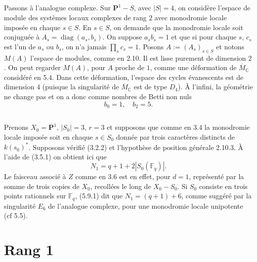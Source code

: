 \documentclass[11pt,a4paper]{article}
\theoremstyle{plain}
\theoremstyle{definition}
\DeclareMathOperator{\diag}{diag}
\newcommand{\F}{\mathbb{F}}
\newcommand{\C}{\mathbb{C}}
\begin{document}
\subsection{}
Passons \`a l'analogue complexe. Sur $\mathbf{P}^1 - S$, avec $|S| = 4$, on consid\`ere l'espace de module des syst\`emes locaux complexes de rang $2$ avec monodromie locale impos\'ee en chaque $s \in S$. En $s \in S$, on demande que la monodromie locale soit conjugu\'ee \`a $A_s = \diag(a_s, b_s)$. On suppose $a_s b_s = 1$ et que si pour chaque $s$, $c_s$ est l'un de $a_s$ ou $b_s$, on n'a jamais $\prod_s c_s = 1$. Posons $A := (A_s)_{s \in S}$ et notons $M(A)$ l'espace de modules, comme en 2.10. Il est lisse purement de dimension $2$. On peut regarder $M(A)$, pour $A$ proche de $1$, comme une d\'eformation de $\overline{M}_\C$ consid\'er\'e en 5.4. Dans cette d\'eformation, l'espace des cycles \'evanescents est de dimension $4$ (puisque la singularit\'e de $\overline{M}_\C$ est de type $D_4$). \`A l'infini, la g\'eom\'etrie ne change pas et on a donc comme nombres de Betti non nuls
\begin{equation}
b_0 = 1, \quad b_2 = 5.
\tag{5.8.1}
\end{equation}

\subsection{}
Prenons $X_0 = \mathbf{P}^1$, $|S_0| = 3$, $r = 3$ et supposons que comme en 3.4 la monodromie locale impos\'ee soit en chaque $s \in S_0$ donn\'ee par trois caract\`eres distincts de $k(s_0)^*$. Supposons v\'erifi\'e (3.2.2) et l'hypoth\`ese de position g\'en\'erale 2.10.3. \`A l'aide de (3.5.1) on obtient ici que
\begin{equation}
N_1 = q + 1 + 2|S_0(\F_q)|.
\tag{5.9.1}
\end{equation}
Le faisceau associ\'e \`a $Z$ comme en 3.6 est en effet, pour $d = 1$, repr\'esent\'e par la somme de trois copies de $X_0$, recoll\'ees le long de $X_0 - S_0$. Si $S_0$ consiste en trois points rationnels sur $\F_q$, (5.9.1) dit que $N_1 = (q+1) + 6$, comme sugg\'er\'e par la singularit\'e $E_6$ de l'analogue complexe, pour une monodromie locale unipotente (cf 5.5).

\section{Rang 1}
\end{document}
